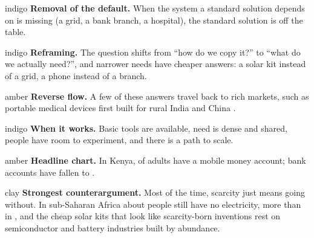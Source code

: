 \clearpage
\thispagestyle{plain}
\vspace{4pt}
\noindent{\color{indigo}\rule{\linewidth}{0.8pt}}
\vspace{10pt}

\vspace{12pt}

\noindent
\begin{minipage}[t]{0.485\linewidth}
\vspace{0pt}
\begin{glancebox}{indigo}
\textbf{\sffamily Removal of the default.} When the system a standard solution
depends on is missing (a grid, a bank branch, a hospital), the standard
solution is off the table.
\end{glancebox}
\begin{glancebox}{indigo}
\textbf{\sffamily Reframing.} The question shifts from ``how do we copy it?'' to
``what do we actually need?'', and narrower needs have cheaper answers: a solar
kit instead of a grid, a phone instead of a branch.
\end{glancebox}
\begin{glancebox}{amber}
\textbf{\sffamily Reverse flow.} A few of these answers travel back to rich
markets, such as portable medical devices first built for rural India and
China \parencite{immelt2009}.
\end{glancebox}
\begin{glancebox}{indigo}
\textbf{\sffamily When it works.} Basic tools are available, need is dense and
shared, people have room to experiment, and there is a path to scale.
\end{glancebox}
\end{minipage}\hfill
\begin{minipage}[t]{0.485\linewidth}
\vspace{0pt}
\begin{glancebox}{amber}
\textbf{\sffamily Headline chart.} In Kenya, \kenMobileMoney{} of adults have a
mobile money account; bank accounts have fallen to \kenBankAccount{}.\par
\smallskip
\centering
\end{glancebox}
\begin{glancebox}{clay}
\textbf{\sffamily\color{clay}Strongest counterargument.} Most of the time,
scarcity just means going without. In sub-Saharan Africa about
\sspWithoutElec{} people still have no electricity, more than in
\sspElecStartYear{}, and the cheap solar kits that look like scarcity-born
inventions rest on semiconductor and battery industries built by abundance.
\end{glancebox}
\end{minipage}
\clearpage

